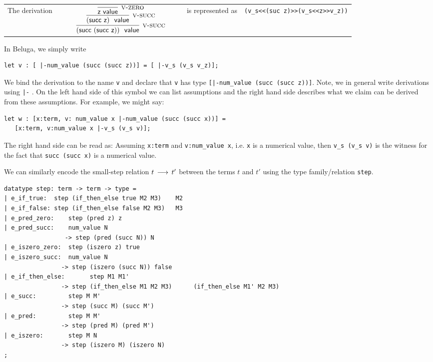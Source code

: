 \begin{tabular}{llll}
The derivation ~~~~& 
$
\infer[\Vsuc]{(\tmsucc (\tmsucc \tmzero))~\isv}
{\infer[\Vsuc]{(\tmsucc \tmzero)~\isv}{
 \infer[\Vzero]{\tmzero \isv}{}
 }
}
$
& ~~~~is represented as &  \lstinline!(v_s<<(suc z)>>(v_s<<z>>v_z))!\\[1em]
\end{tabular}

In Beluga, we simply write 

\begin{lstlisting}
let v : [ |-num_value (succ (succ z))] = [ |-v_s (v_s v_z)];
\end{lstlisting}

We bind the derivation to the name \lstinline!v! and declare that \lstinline!v!
has type \lstinline![|-num_value (succ (succ z))]!. Note, we in general write
derivations using \lstinline!|-! . On the left hand side of this symbol we can
list assumptions and the right hand side describes what we claim can be derived
from these assumptions.  For example, we might say:

\begin{lstlisting}
let w : [x:term, v: num_value x |-num_value (succ (succ x))] = 
   [x:term, v:num_value x |-v_s (v_s v)];
\end{lstlisting}

The right hand side can be read as: Assuming \lstinline!x:term! and
\lstinline!v:num_value x!, i.e. \lstinline!x! is a numerical value, then
\lstinline!v_s (v_s v)! is the witness for the fact that 
\lstinline!succ (succ x)! is a numerical value. 


We can similarly encode the small-step relation $t \mathrel{\,\longrightarrow\,} t'$ between the terms
$t$ and $t'$ using the type family/relation \lstinline!step!.

\begin{lstlisting}
datatype step: term -> term -> type = 
| e_if_true:  step (if_then_else true M2 M3)    M2
| e_if_false: step (if_then_else false M2 M3)   M3
| e_pred_zero:    step (pred z) z
| e_pred_succ:    num_value N
                 -> step (pred (succ N)) N
| e_iszero_zero:  step (iszero z) true
| e_iszero_succ:  num_value N 
                -> step (iszero (succ N)) false
| e_if_then_else:       step M1 M1'
                -> step (if_then_else M1 M2 M3)      (if_then_else M1' M2 M3)
| e_succ:         step M M'
                -> step (succ M) (succ M')
| e_pred:         step M M'
                -> step (pred M) (pred M')
| e_iszero:       step M N
                -> step (iszero M) (iszero N)
;
\end{lstlisting}


